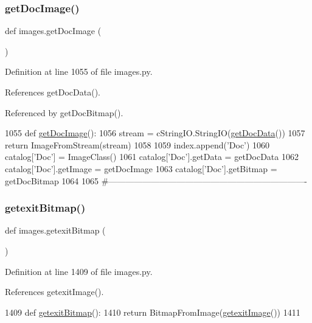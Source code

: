 \subsubsection{\texorpdfstring{get\+Doc\+Image()}{getDocImage()}}
{\footnotesize\ttfamily def images.\+get\+Doc\+Image (\begin{DoxyParamCaption}{ }\end{DoxyParamCaption})}



Definition at line 1055 of file images.\+py.



References get\+Doc\+Data().



Referenced by get\+Doc\+Bitmap().


\begin{DoxyCode}
1055 \textcolor{keyword}{def }\hyperlink{namespaceimages_a3f894481ce4bf93e759ae2435f904776}{getDocImage}():
1056     stream = cStringIO.StringIO(\hyperlink{namespaceimages_a1e1aebcf5b98a65f95e4511e03d9f631}{getDocData}())
1057     \textcolor{keywordflow}{return} ImageFromStream(stream)
1058 
1059 index.append(\textcolor{stringliteral}{'Doc'})
1060 catalog[\textcolor{stringliteral}{'Doc'}] = ImageClass()
1061 catalog[\textcolor{stringliteral}{'Doc'}].getData = getDocData
1062 catalog[\textcolor{stringliteral}{'Doc'}].getImage = getDocImage
1063 catalog[\textcolor{stringliteral}{'Doc'}].getBitmap = getDocBitmap
1064 
1065 \textcolor{comment}{#----------------------------------------------------------------------}
\end{DoxyCode}
\mbox{\label{namespaceimages_abd9fcc57cc491312e7481b88c766a011}} 
\subsubsection{\texorpdfstring{getexit\+Bitmap()}{getexitBitmap()}}
{\footnotesize\ttfamily def images.\+getexit\+Bitmap (\begin{DoxyParamCaption}{ }\end{DoxyParamCaption})}



Definition at line 1409 of file images.\+py.



References getexit\+Image().


\begin{DoxyCode}
1409 \textcolor{keyword}{def }\hyperlink{namespaceimages_abd9fcc57cc491312e7481b88c766a011}{getexitBitmap}():
1410     \textcolor{keywordflow}{return} BitmapFromImage(\hyperlink{namespaceimages_aae00a8f5f5671e8fd7ed806f7f729f9f}{getexitImage}())
1411 
\end{DoxyCode}
\mbox{\label{namespaceimages_a7e5bdbd335598e57701536741f4d8997}} 
